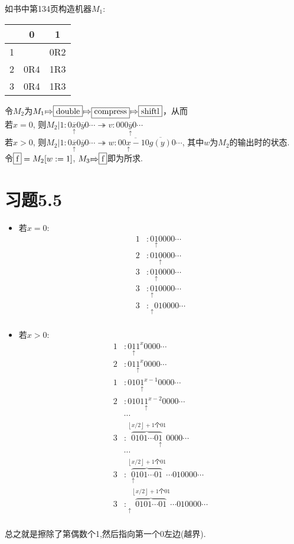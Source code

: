 \documentclass{article}
\newcommand*{\pt}[1]{\ensuremath{\underset{\uparrow}{#1}}}
\newcommand{\RA}[0]{{\shortmid\!\Rightarrow}}
\newcommand{\floor}[1]{\left\lfloor #1 \right\rfloor}
\begin{document}
如书中第134页构造机器$M_1$:

\begin{center}
\begin{tabular}{|c|c|c|}
	\hline
	&0&1\\
	\hline
	1&&0R2\\
	2&0R$4$&1R3\\
	3&0R4&1R3\\

	
	\hline
\end{tabular}
\end{center}

令$M_2$为$M_1 \RA \fbox{double} \RA \fbox{compress} \RA \fbox{shiftl}$，从而\\
若$x=0$, 则$M_2|1:0\pt{\overline x} 0 \overline y 0 \cdots \twoheadrightarrow v : 000\pt{\overline y} 0 \cdots$\\
若$x>0$, 则$M_2|1:0\pt{\overline x} 0 \overline y 0 \cdots \twoheadrightarrow w : 00{ \overline{\pt x-1}} 0 \overline{g(y)} 0\cdots$, 其中$w$为$M_2$的输出时的状态. \\

令$\fbox{f} = M_2[w:=1]$, $M_3\RA\fbox{f}$即为所求. 


\section*{习题5.5}

\begin{itemize}
	\item 若$x=0$:
	\begin{align*}
		1&:0\pt10000\cdots\tag{1R2}\\
		2&:01\pt0000\cdots\tag{0L3}\\
		3&:0\pt10000\cdots\tag{1L3}\\
		3&:\pt010000\cdots\tag{0L3}\\
		3&:\pt{\phantom0}010000\cdots\tag{halt}\\
	\end{align*}
	\item 若$x>0$:
	\begin{align*}
		1&:0\pt11^x0000\cdots\tag{1R2}\\
		2&:01\pt1^x0000\cdots\tag{0R1}\\
		1&:010\pt1^{x-1}0000\cdots\tag{1R2}\\
		2&:0101\pt1^{x-2}0000\cdots\tag{0R1}\\
		&\cdots \tag{1R2, 0R1}\\
		3&:\overbrace{0101\cdots0\pt1}^{\floor{x/2}+1\text{个01}}0000\cdots\tag{1L3}\\
		&\cdots\tag{0L3, 1L3}\\
		3&:\overbrace{\pt0101\cdots01}^{\floor{x/2}+1\text{个01}}\cdots010000\cdots\tag{0L3}\\
		3&:\pt{\phantom0}\overbrace{0101\cdots01}^{\floor{x/2}+1\text{个01}}\cdots010000\cdots\tag{halt}\\
	\end{align*}
\end{itemize}
总之就是擦除了第偶数个1,然后指向第一个0左边(越界).
\end{document}

